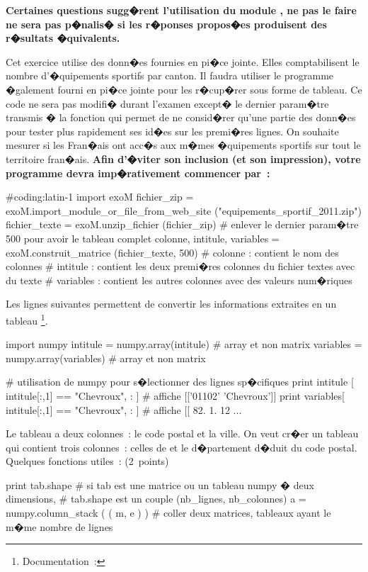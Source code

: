 \textbf{Certaines questions sugg�rent l'utilisation du module , ne pas le faire ne sera pas p�nalis� si les r�ponses propos�es produisent des r�sultats �quivalents. }

Cet exercice utilise des donn�es fournies en pi�ce jointe. Elles comptabilisent le nombre d'�quipements sportifs par canton. Il faudra utiliser le programme �galement fourni en pi�ce jointe pour les r�cup�rer sous forme de tableau. Ce code ne sera pas modifi� durant l'examen except� le dernier param�tre transmis � la fonction  qui permet de ne consid�rer qu'une partie des donn�es pour tester plus rapidement ses id�es sur les premi�res lignes. On souhaite mesurer si les Fran�ais ont acc�s aux m�mes �quipements sportifs sur tout le territoire fran�ais. \textbf{Afin d'�viter son inclusion (et son impression), votre programme devra imp�rativement commencer par~:}

\begin{verbatimx}
#coding:latin-1
import exoM
fichier_zip   = exoM.import_module_or_file_from_web_site ("equipements_sportif_2011.zip")
fichier_texte = exoM.unzip_fichier (fichier_zip)
# enlever le dernier param�tre 500 pour avoir le tableau complet
colonne, intitule, variables = exoM.construit_matrice (fichier_texte, 500)  
    # colonne   : contient le nom des colonnes
    # intitule  : contient les deux premi�res colonnes du fichier textes avec du texte
    # variables : contient les autres colonnes avec des valeurs num�riques 
\end{verbatimx}

Les lignes suivantes permettent de convertir les informations extraites en un tableau \footnote{Documentation~: }.

\begin{verbatimx}
import numpy
intitule  = numpy.array(intitule)  # array et non matrix
variables = numpy.array(variables) # array et non matrix

# utilisation de numpy pour s�lectionner des lignes sp�cifiques
print intitule [ intitule[:,1] == "Chevroux", : ]  # affiche [['01102' 'Chevroux']]
print variables[ intitule[:,1] == "Chevroux", : ]  # affiche [[  82.    1.   12 ...
\end{verbatimx}

\exequest Le tableau  a deux colonnes~: le code postal et la ville. On veut cr�er un tableau  qui contient trois colonnes~: celles de  et le d�partement d�duit du code postal. Quelques fonctions utiles~: (2~points)
\begin{verbatimx}
print tab.shape                     # si tab est une matrice ou un tableau numpy � deux dimensions,
                                    # tab.shape est un couple (nb_lignes, nb_colonnes)
a = numpy.column_stack ( ( m, e ) ) # coller deux matrices, tableaux ayant le m�me nombre de lignes
\end{verbatimx}

